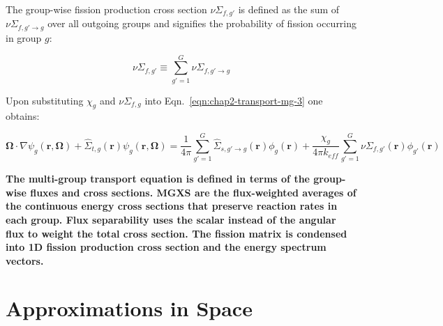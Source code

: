 The group-wise fission production cross section $\nu\Sigma_{f,g'}$ is defined as the sum of $\nu\Sigma_{f,g'\rightarrow g}$ over all outgoing groups and signifies the probability of fission occurring in group $g$:

\begin{dmath}
\label{eqn:chap2-nusifg}
\nu\Sigma_{f,g'} \equiv \displaystyle\sum\limits_{g'=1}^{G}\nu\Sigma_{f,g'\rightarrow g}
\end{dmath}

\noindent Upon substituting $\chi_{g}$ and $\nu\Sigma_{f,g}$ into Eqn.~\ref{eqn:chap2-transport-mg-3} one obtains:

\begin{dmath}
\label{eqn:chap2-transport-mg-4}
\mathbf{\Omega} \cdot \nabla \psi_{g}(\mathbf{r},\mathbf{\Omega}) + \hat{\Sigma}_{t,g}(\mathbf{r})\psi_{g}(\mathbf{r},\mathbf{\Omega}) = \frac{1}{4\pi} \sum_{g'=1}^{G} \hat{\Sigma}_{s,g' \rightarrow g}(\mathbf{r}) \phi_{g}(\mathbf{r}) + \frac{\chi_{g}}{4\pi k_{eff}}\sum_{g'=1}^{G} \nu\Sigma_{f,g'}(\mathbf{r})\phi_{g'}(\mathbf{r})
\end{dmath}




\vspace{0.5cm}
\begin{emphbox}
\textbf{The multi-group transport equation is defined in terms of the group-wise fluxes and cross sections. \ac{MGXS} are the flux-weighted averages of the continuous energy cross sections that preserve reaction rates in each group. Flux separability uses the scalar instead of the angular flux to weight the total cross section. The fission matrix is condensed into 1D fission production cross section and the energy spectrum vectors.}
\end{emphbox}


\section{Approximations in Space}
\label{sec:chap2-approx-space}

